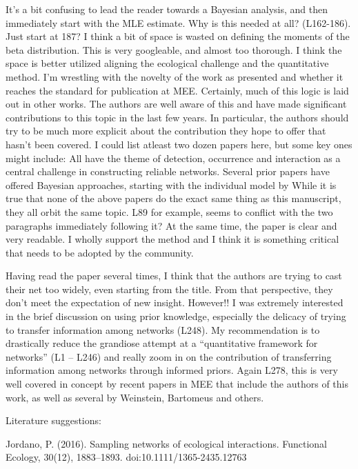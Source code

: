 It’s a bit confusing to lead the reader towards a Bayesian analysis, and then immediately start with the MLE estimate. Why is this needed at all? (L162-186). Just start at 187?
I think a bit of space is wasted on defining the moments of the beta distribution. This is very googleable, and almost too thorough. I think the space is better utilized aligning the ecological challenge and the quantitative method.
I’m wrestling with the novelty of the work as presented and whether it reaches the standard for publication at MEE. Certainly, much of this logic is laid out in other works. The authors are well aware of this and have made significant contributions to this topic in the last few years. In particular, the authors should try to be much more explicit about the contribution they hope to offer that hasn’t been covered. I could list atleast two dozen papers here, but some key ones might include:
All have the theme of detection, occurrence and interaction as a central challenge in constructing
reliable networks. Several prior papers have offered Bayesian approaches, starting with the individual model by
While it is true that none of the above papers do the exact same thing as this manuscript, they all
orbit the same topic. L89 for example, seems to conflict with the two paragraphs immediately following it?
At the same time, the paper is clear and very readable. I wholly support the method and I think it is something critical that needs to be adopted by the community.

Having read the paper several times, I think that the authors are trying to cast their net too widely, even starting from the title. From that perspective, they don’t meet the expectation of new insight. However!! I was extremely interested in the brief discussion on using prior knowledge, especially the delicacy of trying to transfer information among networks (L248). My recommendation is to drastically reduce the grandiose attempt at a “quantitative framework for networks” (L1 – L246) and really zoom in on the contribution of transferring information among networks through informed priors.
Again L278, this is very well covered in concept by recent papers in MEE that include the authors of this work, as well as several by Weinstein, Bartomeus and others.


	Literature suggestions:


Jordano, P. (2016). Sampling networks of ecological interactions. Functional Ecology, 30(12), 1883–1893. doi:10.1111/1365-2435.12763

